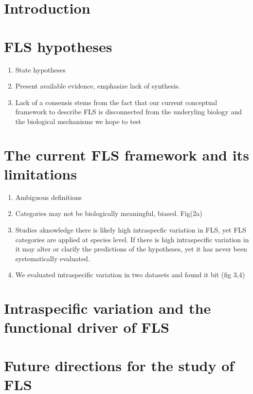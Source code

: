 \documentclass{article}
\begin{document}
\section*{Introduction}

\section*{FLS hypotheses}
\begin{enumerate}
\item State hypotheses
\item Present available evidence, emphasize lack of synthesis.
\item Lack of a consensis stems from the fact that our current conceptual framework to describe FLS is disconnected from the underyling biology and the biological mechanisms we hope to test

\end{enumerate}

\section*{The current FLS framework and its limitations}
\begin{enumerate}
\item Ambiguous definitions
\item Categories may not be biologically meaningful, biased. Fig(2a)
\item Studies aknowledge there is likely high intraspecfic variation in FLS, yet FLS categories are applied at species level. If there is high intraspecific variation in it may alter or clarify the predictions of the hypotheses, yet it has never been systematically evaluated.
\item We evaluated intraspecific variation in two datasets and found it bit (fig 3,4)
\end{enumerate}
\section*{Intraspecific variation and the functional driver of FLS}
\section*{Future directions for the study of FLS}
\end{document}
